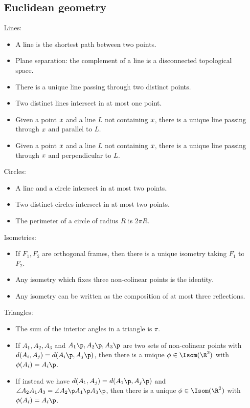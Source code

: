 \setcounter{lecture}{1}
\appendix
{}
\label{app:review-sheets}

\subsection{Euclidean geometry} %
\label{sub:euclidean_geometry}

Lines:
\begin{itemize}
	\shortskip
	\item A line is the shortest path between two points.
	\item Plane separation: the complement of a line is a disconnected topological space.
	\item There is a unique line passing through two distinct points.
	\item Two distinct lines intersect in at most one point.
	\item Given a point $x$ and a line $L$ not containing $x$, there is a unique line passing through $x$ and parallel to $L$. %
	\item Given a point $x$ and a line $L$ not containing $x$, there is a unique line passing through $x$ and perpendicular to $L$. %
\end{itemize}

Circles:
\begin{itemize}
	\shortskip
	\item A line and a circle intersect in at most two points.
	\item Two distinct circles intersect in at most two points.
	\item The perimeter of a circle of radius $R$ is $2\pi R$.
\end{itemize}

Isometries:
\begin{itemize}
	\shortskip
	\item If $F_1, F_2$ are orthogonal frames, then there is a unique isometry taking $F_1$ to $F_2$.
	\item Any isometry which fixes three non-colinear points is the identity.
	\item Any isometry can be written as the composition of at most three reflections.
\end{itemize}

Triangles:
\begin{itemize}
	\shortskip
	\item The sum of the interior angles in a triangle is $\pi$.
	\item If $A_1,A_2,A_3$ and $A_1\p,A_2\p,A_3\p$ are two sets of non-colinear points with $d(A_i,A_j) = d(A_i\p,A_j\p)$, then there is a unique $\phi\in\Isom(\R^2)$ with $\phi(A_i) = A_i\p$. %
	\item If instead we have $d(A_1,A_j) = d(A_1\p,A_j\p)$ and $\angle A_2 A_1 A_3 = \angle A_2\p A_1\p A_3\p$, then there is a unique $\phi\in\Isom(\R^2)$ with $\phi(A_i) = A_i\p$. %
\end{itemize}

